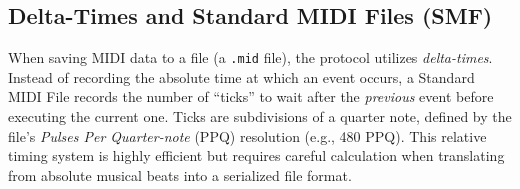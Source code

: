 \subsection{Delta-Times and Standard MIDI Files (SMF)}\label{subsec:delta-times-and-standard-midi-files-(smf)}

When saving MIDI data to a file (a \texttt{.mid} file), the protocol utilizes \textit{delta-times}.
Instead of recording the absolute time at which an event occurs, a Standard MIDI File records the number of ``ticks'' to
wait after the \textit{previous} event before executing the current one.
Ticks are subdivisions of a quarter note, defined by the file's \textit{Pulses Per Quarter-note} (PPQ) resolution (e.g.,
480 PPQ).
This relative timing system is highly efficient but requires careful calculation when translating from absolute musical
beats into a serialized file format.
